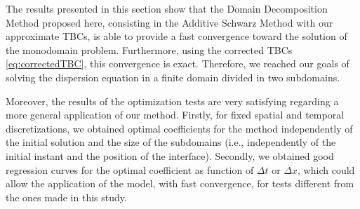 \indent The results presented in this section show that the Domain Decomposition Method proposed here, consisting in the Additive Schwarz Method with our approximate TBCs, is able to provide a fast convergence toward the solution of the monodomain problem. Furthermore, using the corrected TBCs \eqref{eq:correctedTBC}, this convergence is exact. Therefore, we reached our goals of solving the dispersion equation in a finite domain divided in two subdomains.

\indent Moreover, the results of the optimization tests are very satisfying regarding a more general application of our method. Firstly, for fixed spatial and temporal discretizations, we obtained optimal coefficients for the method independently of the initial solution and the size of the subdomains (i.e., independently of the initial instant and the position of the interface). Secondly, we obtained good regression curves for the optimal coefficient as function of $\Delta t$ or $\Delta x$, which could allow the application of the model, with fast convergence, for tests different from the ones made in this study.












